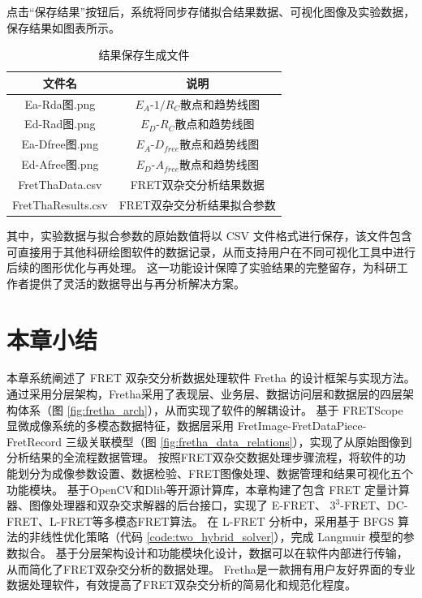 点击“保存结果”按钮后，系统将同步存储拟合结果数据、可视化图像及实验数据，保存结果如图表所示。
\begin{table}[htbp]
  \centering
  \caption{结果保存生成文件}
  \label{tab:fretha_result_list}
    \begin{tabular}{cc}
      \toprule[1.5pt]
      {文件名} & {说明} \\
      \midrule
      Ea-Rda图.png & $E_A$-$1/R_C$散点和趋势线图 \\
      Ed-Rad图.png & $E_D$-$R_C$散点和趋势线图 \\
      Ea-Dfree图.png & $E_A$-$D_{free}$散点和趋势线图 \\
      Ed-Afree图.png & $E_D$-$A_{free}$散点和趋势线图 \\
      FretThaData.csv & FRET双杂交分析结果数据 \\
      FretThaResults.csv & FRET双杂交分析结果拟合参数 \\
      \bottomrule[1.5pt]
    \end{tabular}
\end{table}
其中，实验数据与拟合参数的原始数值将以 CSV 文件格式进行保存，该文件包含可直接用于其他科研绘图软件的数据记录，从而支持用户在不同可视化工具中进行后续的图形优化与再处理。
这一功能设计保障了实验结果的完整留存，为科研工作者提供了灵活的数据导出与再分析解决方案。

\section{本章小结}
本章系统阐述了 FRET 双杂交分析数据处理软件 Fretha 的设计框架与实现方法。
通过采用分层架构，Fretha采用了表现层、业务层、数据访问层和数据层的四层架构体系（图 \ref {fig:fretha_arch}），从而实现了软件的解耦设计。
基于 FRETScope 显微成像系统的多模态数据特征，数据层采用 FretImage-FretDataPiece-FretRecord 三级关联模型（图 \ref {fig:fretha_data_relations}），实现了从原始图像到分析结果的全流程数据管理。
按照FRET双杂交数据处理步骤流程，将软件的功能划分为成像参数设置、数据检验、FRET图像处理、数据管理和结果可视化五个功能模块。
基于OpenCV和Dlib等开源计算库，本章构建了包含 FRET 定量计算器、图像处理器和双杂交求解器的后台接口，实现了 E-FRET、 $3^3$-FRET、DC-FRET、L-FRET等多模态FRET算法。
在 L-FRET 分析中，采用基于 BFGS 算法的非线性优化策略（代码 \ref {code:two_hybrid_solver}），完成 Langmuir 模型的参数拟合。
基于分层架构设计和功能模块化设计，数据可以在软件内部进行传输，从而简化了FRET双杂交分析的数据处理。
Fretha是一款拥有用户友好界面的专业数据处理软件，有效提高了FRET双杂交分析的简易化和规范化程度。